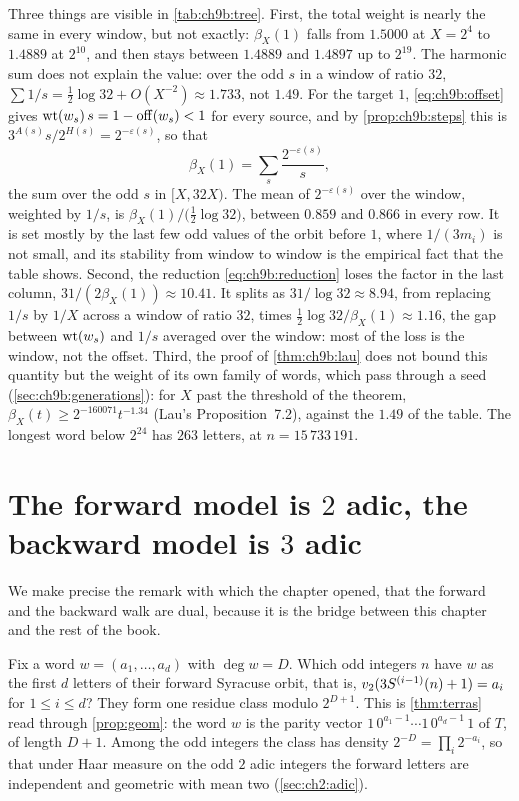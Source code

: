 Three things are visible in \cref{tab:ch9b:tree}. First, the total weight is nearly the same in every window, but not exactly: $\beta_X(1)$ falls from $1.5000$ at $X=2^4$ to $1.4889$ at $2^{10}$, and then stays between $1.4889$ and $1.4897$ up to $2^{19}$. The harmonic sum does not explain the value: over the odd $s$ in a window of ratio $32$, $\sum1/s=\frac12\log32+O(X^{-2})\approx1.733$, not $1.49$. For the target $1$, \eqref{eq:ch9b:offset} gives $\operatorname{wt}(w_s)\,s=1-\operatorname{off}(w_s)<1$ for every source, and by \cref{prop:ch9b:steps} this is $3^{A(s)}s/2^{H(s)}=2^{-\varepsilon(s)}$, so that
\[
  \beta_X(1)=\sum_{s}\frac{2^{-\varepsilon(s)}}{s},
\]
the sum over the odd $s$ in $[X,32X)$. The mean of $2^{-\varepsilon(s)}$ over the window, weighted by $1/s$, is $\beta_X(1)/\bigl(\frac12\log32\bigr)$, between $0.859$ and $0.866$ in every row. It is set mostly by the last few odd values of the orbit before $1$, where $1/(3m_i)$ is not small, and its stability from window to window is the empirical fact that the table shows. Second, the reduction \eqref{eq:ch9b:reduction} loses the factor in the last column, $31/(2\beta_X(1))\approx10.41$. It splits as $31/\log32\approx8.94$, from replacing $1/s$ by $1/X$ across a window of ratio $32$, times $\frac12\log32/\beta_X(1)\approx1.16$, the gap between $\operatorname{wt}(w_s)$ and $1/s$ averaged over the window: most of the loss is the window, not the offset. Third, the proof of \cref{thm:ch9b:lau} does not bound this quantity but the weight of its own family of words, which pass through a seed (\cref{sec:ch9b:generations}): for $X$ past the threshold of the theorem, $\beta_X(t)\ge2^{-160071}t^{-1.34}$ (Lau's Proposition~7.2), against the $1.49$ of the table. The longest word below $2^{24}$ has $263$ letters, at $n=15\,733\,191$.

\section{The forward model is \texorpdfstring{$2$}{2} adic, the backward model is \texorpdfstring{$3$}{3} adic}\label{sec:ch9b:duality}

We make precise the remark with which the chapter opened, that the forward and the backward walk are dual, because it is the bridge between this chapter and the rest of the book.

Fix a word $w=(a_1,\ldots,a_d)$ with $\deg w=D$. Which odd integers $n$ have $w$ as the first $d$ letters of their forward Syracuse orbit, that is, $v_2(3S^{(i-1)}(n)+1)=a_i$ for $1\le i\le d$? They form one residue class modulo $2^{D+1}$. This is \cref{thm:terras} read through \cref{prop:geom}: the word $w$ is the parity vector $1\,0^{a_1-1}\cdots1\,0^{a_d-1}\,1$ of $T$, of length $D+1$. Among the odd integers the class has density $2^{-D}=\prod_i2^{-a_i}$, so that under Haar measure on the odd $2$ adic integers the forward letters are independent and geometric with mean two (\cref{sec:ch2:adic}).

